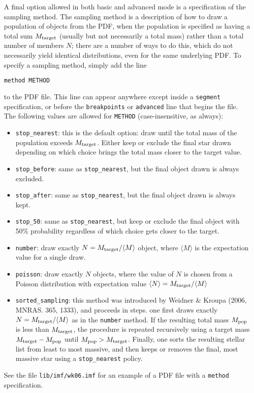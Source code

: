\documentclass[12pt]{article}
\begin{document}
A final option allowed in both basic and advanced mode is a specification of the sampling method. The sampling method is a description of how to draw a population of objects from the PDF, when the population is specified as having a total sum $M_{\rm target}$ (usually but not necessarily a total mass) rather than a total number of members $N$; there are a number of ways to do this, which do not necessarily yield identical distributions, even for the same underlying PDF. To specify a sampling method, simply add the line
\begin{verbatim}
method METHOD
\end{verbatim}
to the PDF file. This line can appear anywhere except inside a \verb=segment= specification, or before the \verb=breakpoints= or \verb=advanced= line that begins the file. The following values are allowed for \verb=METHOD= (case-insensitive, as always):
\begin{itemize}
\item \texttt{stop\_nearest}: this is the default option: draw until the total mass of the population exceeds $M_{\rm target}$. Either keep or exclude the final star drawn depending on which choice brings the total mass closer to the target value.
\item \texttt{stop\_before}: same as \texttt{stop\_nearest}, but the final object drawn is always excluded.
\item \texttt{stop\_after}: same as \texttt{stop\_nearest}, but the final object drawn is always kept.
\item \texttt{stop\_50}: same as \texttt{stop\_nearest}, but keep or exclude the final object with 50\% probability regardless of which choice gets closer to the target.
\item \texttt{number}: draw exactly $N = M_{\rm target}/\langle M\rangle$ object, where $\langle M\rangle$ is the expectation value for a single draw.
\item \texttt{poisson}: draw exactly $N$ objects, where the value of $N$ is chosen from a Poisson distribution with expectation value $\langle N \rangle = M_{\rm target}/\langle M\rangle$
\item \texttt{sorted\_sampling}: this method was introduced by Weidner \& Kroupa (2006, MNRAS. 365, 1333), and proceeds in steps. one first draws exactly $N= M_{\rm target}/\langle M\rangle$ as in the \texttt{number} method. If the resulting total mass $M_{\rm pop}$ is less than $M_{\rm target}$, the procedure is repeated recursively using a target mass $M_{\rm target} - M_{\rm pop}$ until $M_{\rm pop} > M_{\rm target}$. Finally, one sorts the resulting stellar list from least to most massive, and then keeps or removes the final, most massive star using a \texttt{stop\_nearest} policy. 
\end{itemize}
See the file \texttt{lib/imf/wk06.imf} for an example of a PDF file with a \verb=method= specification.
\end{document}
